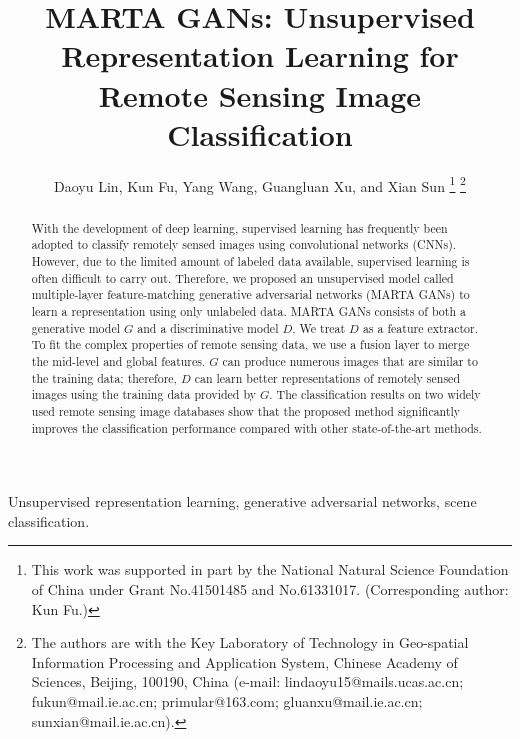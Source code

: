 \documentclass[journal]{IEEEtran}
\begin{document}
\title{MARTA GANs: Unsupervised Representation Learning for
	Remote Sensing Image Classification}

\author{
	Daoyu Lin, Kun Fu, Yang Wang, Guangluan Xu, and Xian Sun 
	\thanks{This work was supported in part by the National Natural Science Foundation of China under Grant No.41501485 and No.61331017. (Corresponding author: Kun Fu.)}
	\thanks{The authors are with the Key Laboratory of Technology in Geo-spatial
	Information Processing and Application System, Chinese Academy of Sciences, Beijing, 100190, China (e-mail: lindaoyu15@mails.ucas.ac.cn; fukun@mail.ie.ac.cn; primular@163.com; gluanxu@mail.ie.ac.cn; sunxian@mail.ie.ac.cn).}

	
	

}










\maketitle
\begin{abstract}
With the development of deep learning, supervised learning has frequently been adopted to classify remotely sensed images using convolutional networks (CNNs). However, due to the limited amount of labeled data available, supervised learning is often difficult to carry out. Therefore, we proposed an unsupervised model called multiple-layer feature-matching generative adversarial networks (MARTA GANs) to learn a representation using only unlabeled data. MARTA GANs consists of both a generative model $G$ and a discriminative model $D$. We treat $D$ as a feature extractor. To fit the complex properties of remote sensing data, we use a fusion layer to merge the mid-level and global features. $G$ can produce numerous images that are similar to the training data; therefore, $D$ can learn better representations of remotely sensed images using the training data provided by $G$. The classification results on two widely used remote sensing image databases show that the proposed method significantly improves the classification performance compared with other state-of-the-art methods.

\end{abstract}

\begin{IEEEkeywords}
	Unsupervised representation learning, generative adversarial networks, scene classification.
\end{IEEEkeywords}
\end{document}
